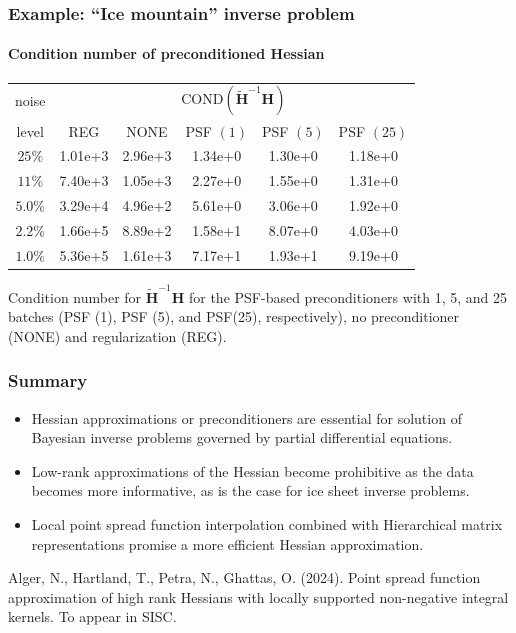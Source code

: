 \documentclass[10pt,final,xcolor=dvipsnames,aspect ratio=169]{beamer}
\newcommand{\preconditioner}{\widetilde{H}}
\begin{document}
\begin{frame}
	\frametitle{Example: ``Ice mountain'' inverse problem}
	\framesubtitle{Condition number of preconditioned Hessian}
	
	\begin{table}
		\begin{center}
			\begingroup
			\setlength{\tabcolsep}{4pt}
			\renewcommand{\arraystretch}{1.25}
			\begin{tabular}{c| c c c c c}
				noise    & \multicolumn{5}{c}{COND$(\mathbf{\preconditioner}^{-1} \mathbf{H})$ } \\ \cline{2-6}
				level    & REG     &	NONE  & PSF $(1)$ & PSF $(5)$ & PSF $(25)$ \\ \hline 
				$25\%$   & 1.01e+3 & 2.96e+3  & 1.34e+0   & 1.30e+0   & 1.18e+0    \\ 
				$11\%$   & 7.40e+3 & 1.05e+3  & 2.27e+0   & 1.55e+0   & 1.31e+0    \\   
				$5.0\%$  & 3.29e+4 & 4.96e+2  & 5.61e+0   & 3.06e+0   & 1.92e+0    \\ 
				$2.2\%$  & 1.66e+5 & 8.89e+2  & 1.58e+1   & 8.07e+0   & 4.03e+0    \\  
				$1.0\%$  & 5.36e+5 & 1.61e+3  & 7.17e+1   & 1.93e+1   & 9.19e+0    \\   
			\end{tabular}
			\endgroup
		\end{center}
	\end{table}
	
		Condition number for $\mathbf{\preconditioner}^{-1} \mathbf{H}$ for
		the PSF-based preconditioners with 1, 5, and 25 batches (PSF (1),
		PSF (5), and PSF(25), respectively), no preconditioner (NONE) and
		regularization (REG).
\end{frame}




\begin{frame}
	\frametitle{Summary}
	
	\begin{itemize}
		\setlength\itemsep{1.5em}
		\item Hessian approximations or preconditioners are essential for solution of Bayesian inverse problems governed by
		partial differential equations.
		\vspace{0.05in}
		\item Low-rank approximations of the Hessian become
		prohibitive as the data becomes more informative, as is the case
		for ice sheet inverse problems.
		\vspace{0.05in}
		\item Local point spread function interpolation combined with Hierarchical matrix representations promise a more efficient
		Hessian approximation.
	\end{itemize}
	\vspace{2em}
	{\small Alger, N., Hartland, T., Petra, N., Ghattas, O. (2024). Point spread function approximation of high rank Hessians with locally supported non-negative integral kernels. To appear in SISC.}
\end{frame}
\end{document}
